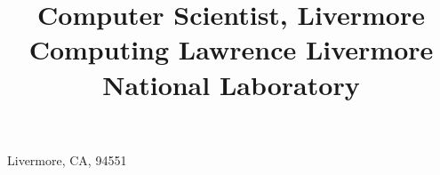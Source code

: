 \title{\normalsize
	Computer Scientist,
	Livermore Computing\newline
	Lawrence Livermore National Laboratory
}                       %
\address{P.O. Box 808, L-556}{Livermore, CA, 94551}    %




\newcommand{\see}[1]{\hfill{\itshape\color{see}\footnotesize{}see #1}}

\newcommand{\br}{\ifinner, \else\\\fi}

\newcommand{\gh}[3]{\href{https://github.com/#1/#2/commits?author=dinatale2}{#3}}
\newcommand{\ghllnl}[2]{\gh{llnl}{#1}{#2}}
\newcommand{\ghzfs}[2]{\gh{zfsonlinux}{#1}{#2}}
\newcommand{\ghopensfs}[2]{\gh{opensfs}{#1}{#2}}
\newcommand{\lustre}[0]{\href{https://git.hpdd.intel.com/?p=fs/lustre-release.git\&a=search\&h=HEAD\&st=commit\&s=dinatale2}{Lustre}}

\makeatletter
\def\@bibitem#1{%
	\def\mykey{#1}%
	\item\if@filesw\immediate\write\@auxout {\string\bibcite{#1}%
	{\the\value{\@listctr}}}\fi\ignorespaces}

